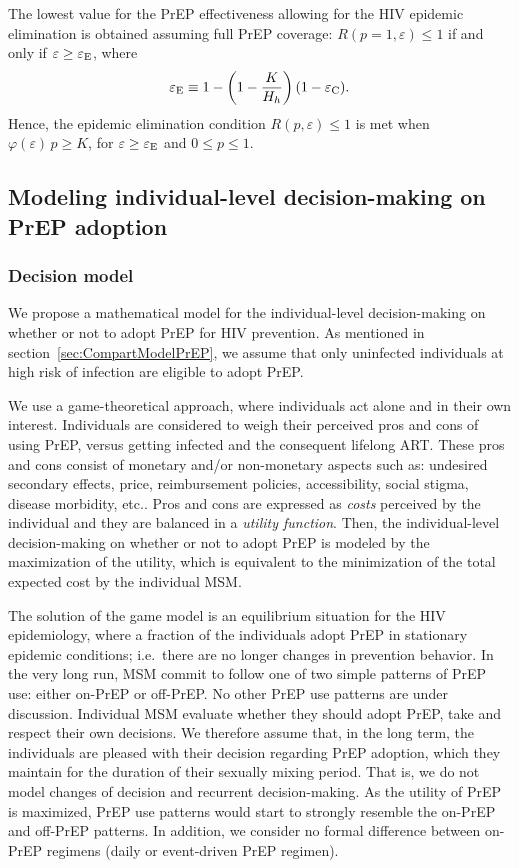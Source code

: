\documentclass[12pt]{article}
\begin{document}
The lowest value for the PrEP effectiveness allowing for the HIV epidemic elimination is obtained assuming full PrEP coverage: $R(p=1,\varepsilon) \leq 1$ if and only if $\varepsilon\geq\varepsilon_{\rm E}$, where
\begin{equation}
	\varepsilon_{\rm E} \equiv 1- \left( 1- \frac{K}{H_h}\right) (1-\varepsilon_{\rm C}).
\end{equation}
Hence, the epidemic elimination condition $R(p,\varepsilon) \leq 1$ is met when $\varphi(\varepsilon) \, p \geq K$, for  $\varepsilon\geq\varepsilon_{\rm E}$ and $0\leq p\leq 1$.


\subsection{Modeling individual-level decision-making on PrEP adoption} \label{sec:DecisionMaking}
\subsubsection{Decision model} \label{sec:DecisionModel}

We propose a mathematical model for the individual-level decision-making on whether or not to adopt PrEP for HIV prevention. As mentioned in section~\ref{sec:CompartModelPrEP}, we assume that only uninfected individuals at high risk of infection are eligible to adopt PrEP. 

We use a game-theoretical approach, where individuals act alone and in their own interest. Individuals are considered to weigh their perceived pros and cons of using PrEP, versus getting infected and the consequent lifelong ART. These pros and cons consist of monetary and/or non-monetary aspects such as: undesired secondary effects, price, reimbursement policies, accessibility, social stigma, disease morbidity, etc.\cite{Arnold2016,Gilson2018,Thomann2017,Brooks2019}. Pros and cons are expressed as {\it costs} perceived by the individual and they are balanced in a {\it utility function}. Then, the individual-level decision-making on whether or not to adopt PrEP is modeled by the maximization of the utility, which is equivalent to the minimization of the total expected cost by the individual MSM.

The solution of the game model is an equilibrium situation for the HIV epidemiology, where a fraction of the individuals adopt PrEP in stationary epidemic conditions; i.e.~there are no longer changes in prevention behavior. {In the very long run, MSM commit to follow one of two simple patterns of PrEP use: either on-PrEP or off-PrEP. No other PrEP use patterns are under discussion. Individual MSM evaluate whether they should adopt PrEP, take and respect their own decisions. We therefore assume that, in the long term, the individuals are pleased with their decision regarding PrEP adoption, which they maintain for the duration of their sexually mixing period. That is, we do not model changes of decision and recurrent decision-making.  As the utility of PrEP is maximized, PrEP use patterns would start to strongly resemble the on-PrEP and off-PrEP patterns. In addition, we consider no formal difference between on-PrEP regimens (daily or event-driven PrEP regimen).  
}
\end{document}
